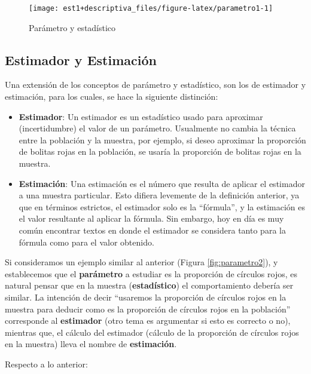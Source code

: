 \documentclass[
]{book}
\begin{document}
\begin{figure}

{\centering \texttt{[image: est1+descriptiva\_files/figure-latex/parametro1-1]} 

}

\caption{Parámetro y estadístico}\label{fig:parametro1}
\end{figure}

\hypertarget{estimador-y-estimaciuxf3n}{%
\subsection{Estimador y Estimación}\label{estimador-y-estimaciuxf3n}}

Una extensión de los conceptos de parámetro y estadístico, son los de estimador y estimación, para los cuales, se hace la siguiente distinción:

\begin{itemize}
\item
  \textbf{Estimador}: Un estimador es un estadístico usado para aproximar (incertidumbre) el valor de un parámetro. Usualmente no cambia la técnica entre la población y la muestra, por ejemplo, si deseo aproximar la proporción de bolitas rojas en la población, se usaría la proporción de bolitas rojas en la muestra.
\item
  \textbf{Estimación}: Una estimación es el número que resulta de aplicar el estimador a una muestra particular. Esto difiera levemente de la definición anterior, ya que en términos estrictos, el estimador solo es la ``fórmula'', y la estimación es el valor resultante al aplicar la fórmula. Sin embargo, hoy en día es muy común encontrar textos en donde el estimador se considera tanto para la fórmula como para el valor obtenido.
\end{itemize}

Si consideramos un ejemplo similar al anterior (Figura \ref{fig:parametro2}), y establecemos que el \textbf{parámetro} a estudiar es la proporción de círculos rojos, es natural pensar que en la muestra (\textbf{estadístico}) el comportamiento debería ser similar. La intención de decir ``usaremos la proporción de círculos rojos en la muestra para deducir como es la proporción de círculos rojos en la población'' corresponde al \textbf{estimador} (otro tema es argumentar si esto es correcto o no), mientras que, el cálculo del estimador (cálculo de la proporción de círculos rojos en la muestra) lleva el nombre de \textbf{estimación}.

Respecto a lo anterior:
\end{document}
